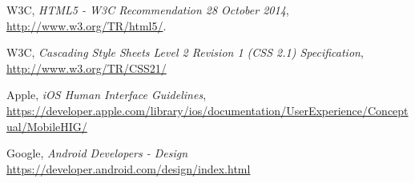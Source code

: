 \begin{thebibliography}{1}
  W3C,
  \emph{HTML5 - W3C Recommendation 28 October 2014}, \url{http://www.w3.org/TR/html5/}.

  W3C,
  \emph{Cascading Style Sheets Level 2 Revision 1 (CSS 2.1) Specification}, \url{http://www.w3.org/TR/CSS21/}

	Apple,
	\emph{iOS Human Interface Guidelines}, \url{https://developer.apple.com/library/ios/documentation/UserExperience/Conceptual/MobileHIG/}
	
	Google,
	\emph{Android Developers - Design}
	\url{https://developer.android.com/design/index.html}
\end{thebibliography}